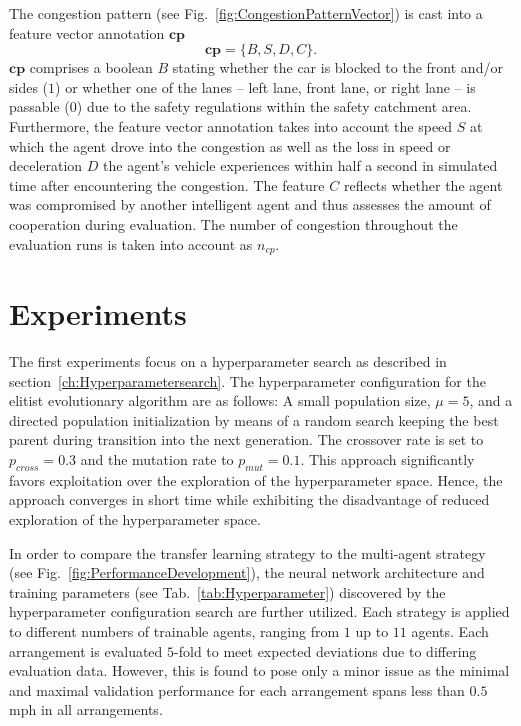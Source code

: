 \documentclass{article}
\begin{document}
The congestion pattern (see Fig.~\ref{fig:CongestionPatternVector}) is cast into a feature vector annotation $\textbf{cp}$
\[
\textbf{cp} = \{ B, S, D, C \}.
\] 
$\textbf{cp}$ comprises a boolean $B$ stating whether the car is blocked to the front and/or sides ($1$) or whether one of the lanes -- left lane, front lane, or right lane -- is passable ($0$) due to the safety regulations within the safety catchment area. Furthermore, the feature vector annotation takes into account  the speed $S$ at which the agent drove into the congestion as well as the loss in speed or deceleration $D$ the agent's vehicle experiences within half a second in simulated time after encountering the congestion. The feature $C$ reflects whether the agent was compromised by another intelligent agent and thus assesses the amount of cooperation during evaluation. The number of congestion throughout the evaluation runs is taken into account as $n_{cp}$.










\section{Experiments}

The first experiments focus on a hyperparameter search as described in section~\ref{ch:Hyperparametersearch}. The hyperparameter configuration for the elitist evolutionary algorithm are as follows:
A small population size, $\mu = 5$, and a directed population initialization  by means of a random search keeping the best parent during transition into the next generation. The crossover rate is set to $p_{cross} = 0.3$ and the mutation rate to $p_{mut} = 0.1$. This approach significantly favors exploitation over the exploration of the hyperparameter space. Hence, the approach converges in short time while exhibiting the disadvantage of reduced exploration of the hyperparameter space.        

In order to compare the transfer learning strategy to the multi-agent strategy (see Fig.~\ref{fig:PerformanceDevelopment}), the neural network architecture and training parameters (see Tab.~\ref{tab:Hyperparameter}) discovered by the hyperparameter configuration search are further utilized. Each strategy is applied to different numbers of trainable agents, ranging from $1$ up to $11$ agents. Each arrangement is evaluated $5$-fold to meet expected deviations due to differing evaluation data. However, this is found to pose only a minor issue as the minimal and maximal validation performance for each arrangement spans less than $0.5$ mph in all arrangements.
\end{document}
